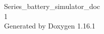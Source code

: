 \documentclass[twoside]{book}
\newcommand{\+}{\discretionary{\mbox{\scriptsize$\hookleftarrow$}}{}{}}
\newcommand{\clearemptydoublepage}{%
    \newpage{\pagestyle{empty}\cleardoublepage}%
  }
\begin{document}
  \raggedbottom
  \begin{titlepage}
  \vspace*{7cm}
  \begin{center}%
  {\Large Series\+\_\+battery\+\_\+simulator\+\_\+doc}\\
  [1ex]\large 1 \\
  \vspace*{1cm}
  {\large Generated by Doxygen 1.16.1}\\
  \end{center}
  \end{titlepage}
  \clearemptydoublepage
  \tableofcontents
  \clearemptydoublepage

  \backmatter
  \newpage
  \clearemptydoublepage
  \printindex
\end{document}
